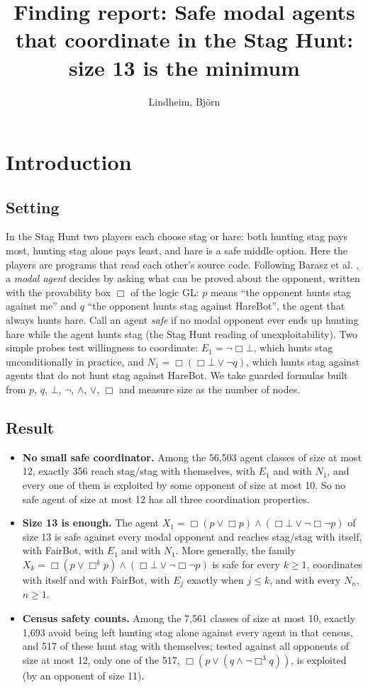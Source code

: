 \documentclass{article}
\title{Finding report: Safe modal agents that coordinate in the Stag Hunt: size 13 is the minimum}
\author{Lindheim, Björn}
\date{}
\begin{document}
\maketitle
\section{Introduction}
\label{sec:staghunt-safe-coordinators}

\subsection*{Setting}

In the Stag Hunt two players each choose stag or hare: both hunting stag pays most, hunting stag
alone pays least, and hare is a safe middle option. Here the players are programs that read each
other's source code. Following Barasz et al. \cite{barasz2014robust}, a \emph{modal agent} decides by
asking what can be proved about the opponent, written with the provability box $\Box$ of the
logic GL: $p$ means ``the opponent hunts stag against me'' and $q$ ``the opponent hunts stag against
HareBot'', the agent that always hunts hare. Call an agent \emph{safe} if no modal opponent ever ends up
hunting hare while the agent hunts stag (the Stag Hunt reading of unexploitability). Two simple
probes test willingness to coordinate: $E_1 = \neg\Box\bot$, which hunts stag unconditionally in
practice, and $N_1 = \Box(\Box\bot \vee \neg q)$, which hunts stag against agents that do not
hunt stag against HareBot. We take guarded formulas built from $p$, $q$, $\bot$, $\neg$,
$\wedge$, $\vee$, $\Box$ and measure size as the number of nodes.

\subsection*{Result}

\begin{itemize}
\item \textbf{No small safe coordinator.} Among the 56,503 agent classes of size at most 12, exactly 356 reach stag/stag with themselves, with $E_1$ and with $N_1$, and every one of them is exploited by some opponent of size at most 10. So no safe agent of size at most 12 has all three coordination properties.
\item \textbf{Size 13 is enough.} The agent $X_1 = \Box(p \vee \Box p) \wedge (\Box\bot \vee \neg\Box\neg p)$ of size 13 is safe against every modal opponent and reaches stag/stag with itself, with FairBot, with $E_1$ and with $N_1$. More generally, the family $X_k = \Box(p \vee \Box^k p) \wedge (\Box\bot \vee \neg\Box\neg p)$ is safe for every $k \ge 1$, coordinates with itself and with FairBot, with $E_j$ exactly when $j \le k$, and with every $N_n$, $n \ge 1$.
\item \textbf{Census safety counts.} Among the 7,561 classes of size at most 10, exactly 1,693 avoid being left hunting stag alone against every agent in that census, and 517 of these hunt stag with themselves; tested against all opponents of size at most 12, only one of the 517, $\Box(p \vee (q \wedge \neg\Box^3 q))$, is exploited (by an opponent of size 11).
\end{itemize}
\end{document}
